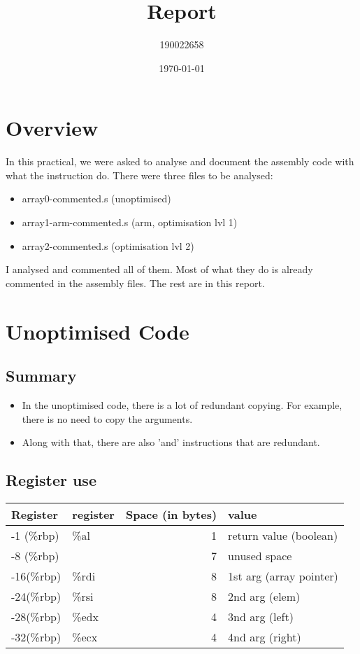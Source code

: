 \documentclass[11pt]{article}
\author{190022658}
\date{\today}
\title{Report}
\begin{document}
\maketitle

\section{Overview}
\label{sec:org5eae406}
In this practical, we were asked to analyse and document the assembly code with what the instruction do. There were three files to be analysed:
\begin{itemize}
\item array0-commented.s (unoptimised)
\item array1-arm-commented.s (arm, optimisation lvl 1)
\item array2-commented.s (optimisation lvl 2)
\end{itemize}
I analysed and commented all of them. Most of what they do is already commented in the assembly files. The rest are in this report.


\section{Unoptimised Code}
\label{sec:org4671a17}

\subsection{Summary}
\label{sec:org6aef28a}
\begin{itemize}
\item In the unoptimised code, there is a lot of redundant copying. For example, there is no need to copy the arguments.
\item Along with that, there are also 'and' instructions that are redundant.
\end{itemize}


\subsection{Register use}
\label{sec:org92fdac9}
\begin{center}
\begin{tabular}{llrl}
\hline
Register & register & Space (in bytes) & value\\
\hline
-1 (\%rbp) & \%al & 1 & return value (boolean)\\
-8 (\%rbp) &  & 7 & unused space\\
-16(\%rbp) & \%rdi & 8 & 1st arg (array pointer)\\
-24(\%rbp) & \%rsi & 8 & 2nd arg (elem)\\
-28(\%rbp) & \%edx & 4 & 3nd arg (left)\\
-32(\%rbp) & \%ecx & 4 & 4nd arg (right)\\
\hline
\end{tabular}
\end{center}
\end{document}
